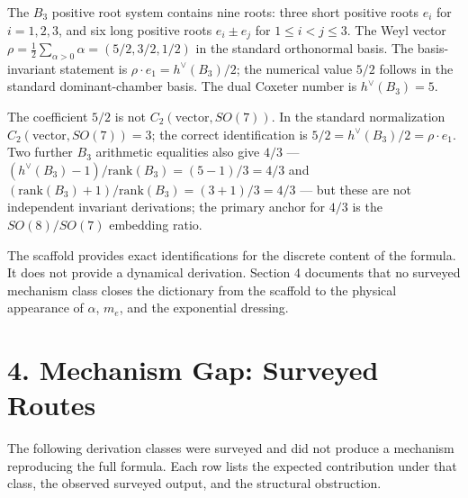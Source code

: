 \documentclass[
  11pt,
  letterpaper,
  twocolumn,
]{article}
\begin{document}
The \(B_3\) positive root system contains nine roots: three short
positive roots \(e_i\) for \(i=1,2,3\), and six long positive roots
\(e_i\!\pm\!e_j\) for \(1\!\le\!i\!<\!j\!\le\!3\). The Weyl vector
\(\rho = \tfrac{1}{2}\sum_{\alpha>0}\alpha = (5/2, 3/2, 1/2)\) in the
standard orthonormal basis. The basis-invariant statement is
\(\rho\!\cdot\!e_1 = h^\vee(B_3)/2\); the numerical value \(5/2\)
follows in the standard dominant-chamber basis. The dual Coxeter number
is \(h^\vee(B_3) = 5\).

The coefficient \(5/2\) is not \(C_2(\mathrm{vector}, SO(7))\). In the
standard normalization \(C_2(\mathrm{vector}, SO(7)) = 3\); the correct
identification is \(5/2 = h^\vee(B_3)/2 = \rho\!\cdot\!e_1\). Two
further \(B_3\) arithmetic equalities also give \(4/3\) ---
\((h^\vee(B_3)-1)/\mathrm{rank}(B_3) = (5-1)/3 = 4/3\) and
\((\mathrm{rank}(B_3)+1)/\mathrm{rank}(B_3) = (3+1)/3 = 4/3\) --- but
these are not independent invariant derivations; the primary anchor for
\(4/3\) is the \(SO(8)/SO(7)\) embedding ratio.

The scaffold provides exact identifications for the discrete content of
the formula. It does not provide a dynamical derivation. Section 4
documents that no surveyed mechanism class closes the dictionary from
the scaffold to the physical appearance of \(\alpha\), \(m_e\), and the
exponential dressing.

\section{4. Mechanism Gap: Surveyed
Routes}\label{mechanism-gap-surveyed-routes}

The following derivation classes were surveyed and did not produce a
mechanism reproducing the full formula. Each row lists the expected
contribution under that class, the observed surveyed output, and the
structural obstruction.
\end{document}
